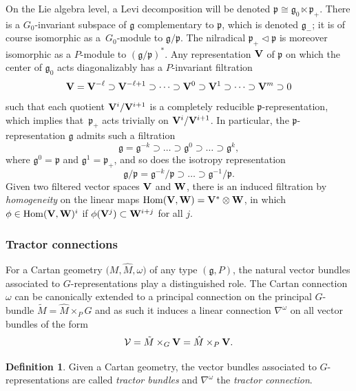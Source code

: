 \documentclass[10pt,a4paper]{amsart}
\numberwithin{equation}{section}
\theoremstyle{definition}
\newtheorem{defin}[thm]{Definition}
\def\g{{\mathfrak g}}
\def\p{{\mathfrak p}}
\begin{document}
On the Lie algebra level, a Levi decomposition will be denoted $\p \cong \g_0 \ltimes \p_+$. There is a $G_0$-invariant subspace of $\g$ complementary to $\p$, which is denoted $\g_-$; it is of course isomorphic as a~$G_0$-module to $\g/\p$. The nilradical $\p_+ \lhd \p$ is moreover isomorphic as a $P$-module to $(\g/\p)^*$. Any representation $\bf V$ of $\p$ on which the center of $\g_0$ acts diagonalizably
has
 a $P$-invariant filtration
\begin{equation}\label{filtration_rep}
{\bf V}={\bf V}^{-\ell}\supset {\bf V}^{- \ell+1}\supset \cdots \supset {\bf V}^0\supset {\bf V}^{1}\supset \cdots \supset {\bf V}^{m} \supset 0
\end{equation}
such that each quotient ${\bf V}^{i}/{\bf V}^{i+1}$ is a completely reducible $\p$-representation, which implies that~$\p_+$ acts trivially on ${\bf V}^{i}/{\bf V}^{i+1}$.
In particular, the $\p$-representation $\g$ admits such a filtration
 \begin{equation*}
 \g=\g^{-k}\supset\dots \supset \g^0\supset\dots \supset \g^k,
 \end{equation*}
 where $\g^0=\p$ and $\g^1=\p_+$, and so does the isotropy representation
 \begin{equation}\label{filtr_g/p}
 \g/\p=\g^{-k}/\p\supset\dots \supset \g^{-1}/\p.
\end{equation}
Given two filtered vector spaces $\bf V$ and $\bf W$, there is an induced filtration by \emph{homogeneity} on the linear maps $\operatorname{Hom}({\bf V},{\bf W})={\bf V}^*\otimes {\bf W}$,
in which $\phi\in\operatorname{Hom}({\bf V},{\bf W})^i$ if $\phi({\bf V}^j)\subset {\bf W}^{i+j}$ for all $j$.

\subsubsection{Tractor connections}
\label{sec.tractor.connxns}
For a Cartan geometry $\bigl(M,\hat{M}, \omega\bigr)$ of any type $(\g,P)$, the natural vector bundles associated to $G$-representations play a distinguished role.
The Cartan connection $\omega$ can be canonically extended to a principal connection on the principal $G$-bundle $\tilde{M}= \hat{M} \times_PG$ and as such it induces a linear connection
$\nabla^\omega$ on all vector bundles of the form
\[\mathcal V=\tilde{M} \times_G{\bf V}= \hat{M} \times_P{\bf V}.\]
\begin{defin} Given a Cartan geometry,
the vector bundles associated to $G$-representations are called \emph{tractor bundles} and $\nabla^\omega$ the \emph{tractor connection}.
\end{defin}
\end{document}
